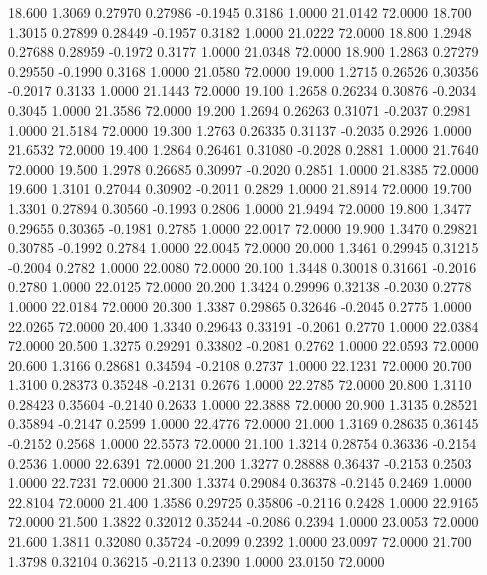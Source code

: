  18.600   1.3069   0.27970   0.27986  -0.1945   0.3186   1.0000  21.0142  72.0000
  18.700   1.3015   0.27899   0.28449  -0.1957   0.3182   1.0000  21.0222  72.0000
  18.800   1.2948   0.27688   0.28959  -0.1972   0.3177   1.0000  21.0348  72.0000
  18.900   1.2863   0.27279   0.29550  -0.1990   0.3168   1.0000  21.0580  72.0000
  19.000   1.2715   0.26526   0.30356  -0.2017   0.3133   1.0000  21.1443  72.0000
  19.100   1.2658   0.26234   0.30876  -0.2034   0.3045   1.0000  21.3586  72.0000
  19.200   1.2694   0.26263   0.31071  -0.2037   0.2981   1.0000  21.5184  72.0000
  19.300   1.2763   0.26335   0.31137  -0.2035   0.2926   1.0000  21.6532  72.0000
  19.400   1.2864   0.26461   0.31080  -0.2028   0.2881   1.0000  21.7640  72.0000
  19.500   1.2978   0.26685   0.30997  -0.2020   0.2851   1.0000  21.8385  72.0000
  19.600   1.3101   0.27044   0.30902  -0.2011   0.2829   1.0000  21.8914  72.0000
  19.700   1.3301   0.27894   0.30560  -0.1993   0.2806   1.0000  21.9494  72.0000
  19.800   1.3477   0.29655   0.30365  -0.1981   0.2785   1.0000  22.0017  72.0000
  19.900   1.3470   0.29821   0.30785  -0.1992   0.2784   1.0000  22.0045  72.0000
  20.000   1.3461   0.29945   0.31215  -0.2004   0.2782   1.0000  22.0080  72.0000
  20.100   1.3448   0.30018   0.31661  -0.2016   0.2780   1.0000  22.0125  72.0000
  20.200   1.3424   0.29996   0.32138  -0.2030   0.2778   1.0000  22.0184  72.0000
  20.300   1.3387   0.29865   0.32646  -0.2045   0.2775   1.0000  22.0265  72.0000
  20.400   1.3340   0.29643   0.33191  -0.2061   0.2770   1.0000  22.0384  72.0000
  20.500   1.3275   0.29291   0.33802  -0.2081   0.2762   1.0000  22.0593  72.0000
  20.600   1.3166   0.28681   0.34594  -0.2108   0.2737   1.0000  22.1231  72.0000
  20.700   1.3100   0.28373   0.35248  -0.2131   0.2676   1.0000  22.2785  72.0000
  20.800   1.3110   0.28423   0.35604  -0.2140   0.2633   1.0000  22.3888  72.0000
  20.900   1.3135   0.28521   0.35894  -0.2147   0.2599   1.0000  22.4776  72.0000
  21.000   1.3169   0.28635   0.36145  -0.2152   0.2568   1.0000  22.5573  72.0000
  21.100   1.3214   0.28754   0.36336  -0.2154   0.2536   1.0000  22.6391  72.0000
  21.200   1.3277   0.28888   0.36437  -0.2153   0.2503   1.0000  22.7231  72.0000
  21.300   1.3374   0.29084   0.36378  -0.2145   0.2469   1.0000  22.8104  72.0000
  21.400   1.3586   0.29725   0.35806  -0.2116   0.2428   1.0000  22.9165  72.0000
  21.500   1.3822   0.32012   0.35244  -0.2086   0.2394   1.0000  23.0053  72.0000
  21.600   1.3811   0.32080   0.35724  -0.2099   0.2392   1.0000  23.0097  72.0000
  21.700   1.3798   0.32104   0.36215  -0.2113   0.2390   1.0000  23.0150  72.0000
